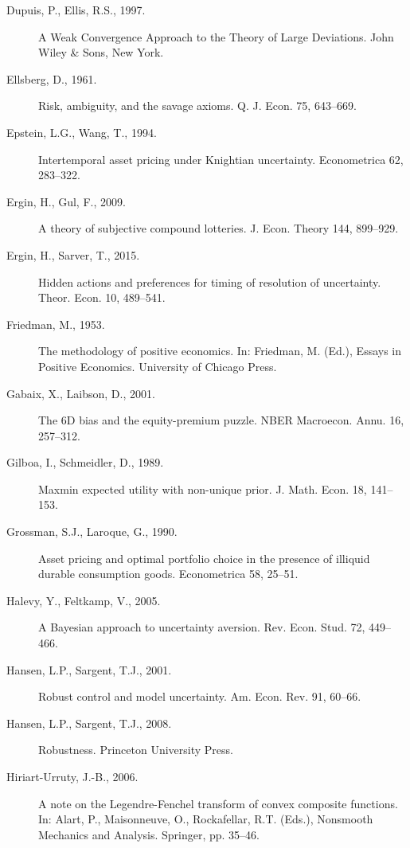 \documentclass[12pt,a4paper]{article}
\newenvironment{original}
  {\par\noindent\color{black}\smallskip}
  {\par\smallskip}
\begin{document}
\begin{original}
\begin{description}
\item[Dupuis, P., Ellis, R.S., 1997.] A Weak Convergence Approach to the Theory of Large Deviations. John Wiley \& Sons, New York.

\item[Ellsberg, D., 1961.] Risk, ambiguity, and the savage axioms. Q. J. Econ. 75, 643--669.

\item[Epstein, L.G., Wang, T., 1994.] Intertemporal asset pricing under Knightian uncertainty. Econometrica 62, 283--322.

\item[Ergin, H., Gul, F., 2009.] A theory of subjective compound lotteries. J. Econ. Theory 144, 899--929.

\item[Ergin, H., Sarver, T., 2015.] Hidden actions and preferences for timing of resolution of uncertainty. Theor. Econ. 10, 489--541.

\item[Friedman, M., 1953.] The methodology of positive economics. In: Friedman, M. (Ed.), Essays in Positive Economics. University of Chicago Press.

\item[Gabaix, X., Laibson, D., 2001.] The 6D bias and the equity-premium puzzle. NBER Macroecon. Annu. 16, 257--312.

\item[Gilboa, I., Schmeidler, D., 1989.] Maxmin expected utility with non-unique prior. J. Math. Econ. 18, 141--153.

\item[Grossman, S.J., Laroque, G., 1990.] Asset pricing and optimal portfolio choice in the presence of illiquid durable consumption goods. Econometrica 58, 25--51.

\item[Halevy, Y., Feltkamp, V., 2005.] A Bayesian approach to uncertainty aversion. Rev. Econ. Stud. 72, 449--466.

\item[Hansen, L.P., Sargent, T.J., 2001.] Robust control and model uncertainty. Am. Econ. Rev. 91, 60--66.

\item[Hansen, L.P., Sargent, T.J., 2008.] Robustness. Princeton University Press.

\item[Hiriart-Urruty, J.-B., 2006.] A note on the Legendre-Fenchel transform of convex composite functions. In: Alart, P., Maisonneuve, O., Rockafellar, R.T. (Eds.), Nonsmooth Mechanics and Analysis. Springer, pp. 35--46.


\end{description}
\end{original}
\end{document}
